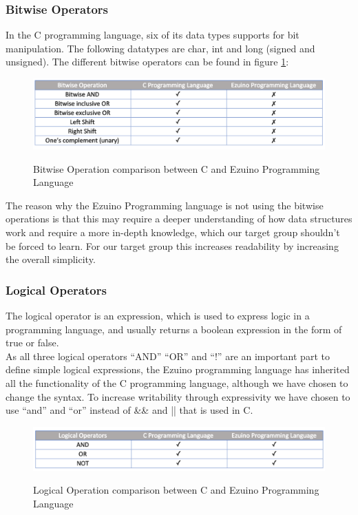 \subsubsection*{Bitwise Operators}
In the C programming language, six of its data types supports for bit manipulation. The following datatypes are char, int and long (signed and unsigned). The different bitwise operators can be found in figure \ref{lf02}:
\begin{figure}[H]
\centering
\caption{Bitwise Operation comparison between C and Ezuino Programming Language}
\includegraphics[scale=0.60]{figures/language_features/langf02.png}
\label{lf02}
\end{figure}
The reason why the Ezuino Programming language is not using the bitwise operations is that this may require a deeper understanding of how data structures work and require a more in-depth knowledge, which our target group shouldn’t be forced to learn. For our target group this increases readability by increasing the overall simplicity.
\subsubsection*{Logical Operators}
The logical operator is an expression, which is used to express logic in a programming language, and usually returns a boolean expression in the form of true or false. \\
As all three logical operators “AND” “OR” and “!” are an important part to define simple logical expressions, the Ezuino programming language has inherited all the functionality of the C programming language, although we have chosen to change the syntax. To increase writability through expressivity we have chosen to use “and” and “or” instead of \&\& and || that is used in C.\\
\begin{figure}[H]
\centering
\caption{Logical Operation comparison between C and Ezuino Programming Language}
\includegraphics[scale=0.60]{figures/language_features/langf03.png}
\label{lf03}
\end{figure}

